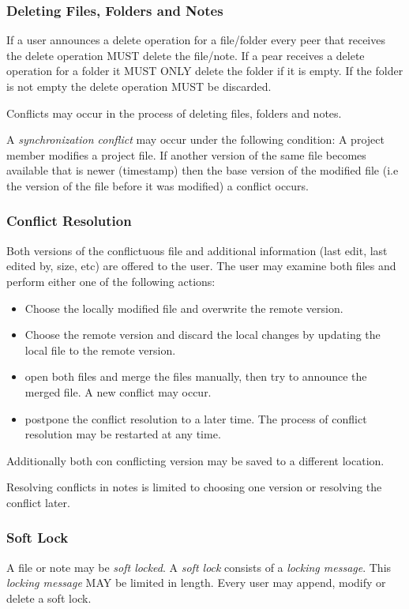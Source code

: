 \subsubsection{Deleting Files, Folders and Notes}
If a user announces a delete operation for a file/folder every peer that receives the delete operation MUST delete the file/note. If a pear receives a delete operation for a folder it MUST ONLY delete the folder if it is empty. If the folder is not empty the delete operation MUST be discarded.

Conflicts may occur in the process of deleting files, folders and notes.

A \emph{synchronization conflict} may occur under the following condition: A project member modifies a project file. If another version of the same file becomes available that is newer (timestamp) then the base version of the modified file (i.e the version of the file before it was modified) a conflict occurs.

\subsubsection{Conflict Resolution}
Both versions of the conflictuous file and additional information (last edit, last edited by, size, etc) are offered to the user. The user may examine both files and perform either one of the following actions:
\begin{itemize}
\item Choose the locally modified file and overwrite the remote version.
\item Choose the remote version and discard the local changes by updating the local file to the remote version.
\item open both files and merge the files manually, then try to announce the merged file. A new conflict may occur.
\item postpone the conflict resolution to a later time. The process of conflict resolution may be restarted at any time.
\end{itemize}
Additionally both con conflicting version may be saved to a different location.

Resolving conflicts in notes is limited to choosing one version or resolving the conflict later.

\subsubsection{Soft Lock}
A file or note may be \emph{soft locked}. A \emph{soft lock} consists of a \emph{locking message}. This \emph{locking message} MAY be limited in length. Every user may append, modify or delete a soft lock. 

